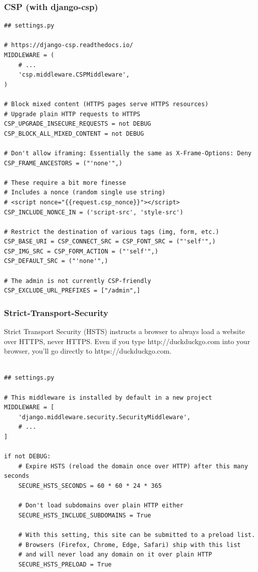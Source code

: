 \documentclass[handout]{beamer}
\begin{document}
\begin{frame}[fragile]
\frametitle{CSP (with django-csp)}
{\tiny
\begin{verbatim}
## settings.py

# https://django-csp.readthedocs.io/
MIDDLEWARE = (
    # ...
    'csp.middleware.CSPMiddleware',
)

# Block mixed content (HTTPS pages serve HTTPS resources)
# Upgrade plain HTTP requests to HTTPS
CSP_UPGRADE_INSECURE_REQUESTS = not DEBUG
CSP_BLOCK_ALL_MIXED_CONTENT = not DEBUG

# Don't allow iframing: Essentially the same as X-Frame-Options: Deny
CSP_FRAME_ANCESTORS = ("'none'",)

# These require a bit more finesse
# Includes a nonce (random single use string)
# <script nonce="{{request.csp_nonce}}"></script>
CSP_INCLUDE_NONCE_IN = ('script-src', 'style-src')

# Restrict the destination of various tags (img, form, etc.)
CSP_BASE_URI = CSP_CONNECT_SRC = CSP_FONT_SRC = ("'self'",)
CSP_IMG_SRC = CSP_FORM_ACTION = ("'self'",)
CSP_DEFAULT_SRC = ("'none'",)

# The admin is not currently CSP-friendly
CSP_EXCLUDE_URL_PREFIXES = ["/admin",]

\end{verbatim}
}
\end{frame}


\begin{frame}[fragile]
\frametitle{Strict-Transport-Security}
{\tiny

Strict Transport Security (HSTS) instructs a browser to always load a website over HTTPS, never HTTPS.
Even if you type http://duckduckgo.com into your browser, you'll go directly to https://duckduckgo.com.

\vfill

\begin{verbatim}

## settings.py

# This middleware is installed by default in a new project
MIDDLEWARE = [
    'django.middleware.security.SecurityMiddleware',
    # ...
]

if not DEBUG:
    # Expire HSTS (reload the domain once over HTTP) after this many seconds
    SECURE_HSTS_SECONDS = 60 * 60 * 24 * 365

    # Don't load subdomains over plain HTTP either
    SECURE_HSTS_INCLUDE_SUBDOMAINS = True

    # With this setting, this site can be submitted to a preload list.
    # Browsers (Firefox, Chrome, Edge, Safari) ship with this list
    # and will never load any domain on it over plain HTTP
    SECURE_HSTS_PRELOAD = True

\end{verbatim}
}
\end{frame}
\end{document}
